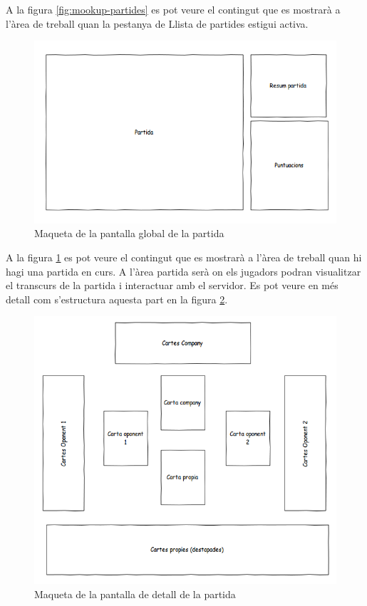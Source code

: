 A la figura \ref{fig:mookup-partides} es pot veure el contingut que es mostrarà a l'àrea de treball quan la pestanya de Llista de partides estigui activa. 

\begin{figure}[htbp]
\centering\includegraphics[width=14cm]{img/Global_Partida.png}
\caption{Maqueta de la pantalla global de la partida}
\label{fig:mookup-partida}
\end{figure} 

A la figura \ref{fig:mookup-partida} es pot veure el contingut que es mostrarà a l'àrea de treball quan hi hagi una partida en curs. A l'àrea partida serà on els jugadors podran visualitzar el transcurs de la partida i interactuar amb el servidor. Es pot veure en més detall com s'estructura aquesta part en la figura \ref{fig:mookup-detall}.
\begin{figure}[htbp]
\centering\includegraphics[width=14cm]{img/Detall_partida.png}
\caption{Maqueta de la pantalla de detall de la partida}
\label{fig:mookup-detall}
\end{figure} 

